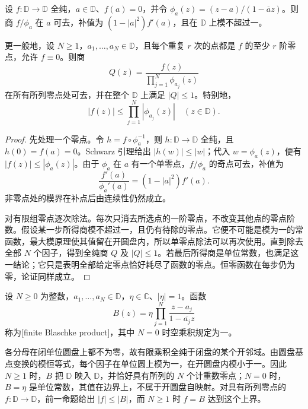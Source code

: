 \begin{proposition}\label{b3:prop:06-blaschke-division}
设 \(f:\mathbb D\rightarrow\mathbb D\) 全纯，\(a\in\mathbb D\)、\(f(a)=0\)，并令 \(\phi_a(z)=(z-a)/(1-\overline a z)\)。则商 \(f/\phi_a\) 在 \(a\) 可去，补值为 \((1-|a|^2)f'(a)\)，且在 \(\mathbb D\) 上模不超过一。

更一般地，设 \(N\ge1\)，\(a_1,\ldots,a_N\in\mathbb D\)，且每个重复 \(r\) 次的点都是 \(f\) 的至少 \(r\) 阶零点，允许 \(f\equiv0\)。则商
\[
 Q(z)=\frac{f(z)}{\prod_{j=1}^N\phi_{a_j}(z)}
\]
在所有所列零点处可去，并在整个 \(\mathbb D\) 上满足 \(|Q|\le1\)。特别地，
\[
 |f(z)|\le\prod_{j=1}^N|\phi_{a_j}(z)|\quad(z\in\mathbb D).
\]
\end{proposition}
\begin{proof}
先处理一个零点。令 \(h=f\circ\phi_a^{-1}\)，则 \(h:\mathbb D\to\mathbb D\) 全纯，且 \(h(0)=f(a)=0\)。Schwarz 引理给出 \(|h(w)|\le|w|\)；代入 \(w=\phi_a(z)\)，便有 \(|f(z)|\le|\phi_a(z)|\)。由于 \(\phi_a\) 在 \(a\) 有一个单零点，\(f/\phi_a\) 的奇点可去，补值为
\[
 \frac{f'(a)}{\phi_a'(a)}=(1-|a|^2)f'(a).
\]
非零点处的模界在补点后由连续性仍然成立。

对有限组零点逐次除法。每次只消去所选点的一阶零点，不改变其他点的零点阶数。假设某一步所得商模不超过一，且仍有待除的零点。它便不可能是模为一的常函数，最大模原理使其值留在开圆盘内，所以单零点除法可以再次使用。直到除去全部 \(N\) 个因子，得到全纯商 \(Q\) 及 \(|Q|\le1\)。若最后所得商是单位常数，也满足这一结论；它只是表明全部给定零点恰好耗尽了函数的零点。恒零函数在每步仍为零，论证同样成立。
\end{proof}

\begin{definition}\label{b3:def:06-finite-blaschke}
设 \(N\ge0\) 为整数，\(a_1,\ldots,a_N\in\mathbb D\)，\(\eta\in\mathbb C\)、\(|\eta|=1\)。函数
\[
 B(z)=\eta\prod_{j=1}^N\frac{z-a_j}{1-\overline{a_j}z}
\]
称为[finite Blaschke product]，其中 \(N=0\) 时空乘积规定为一。
\end{definition}

各分母在闭单位圆盘上都不为零，故有限乘积全纯于闭盘的某个开邻域。由圆盘基点变换的模恒等式，每个因子在单位圆上模为一，在开圆盘内模小于一。因此 \(N\ge1\) 时，\(B\) 把 \(\mathbb D\) 映入 \(\mathbb D\)，并恰好具有所列的 \(N\) 个计重数零点；\(N=0\) 时，\(B=\eta\) 是单位常数，其值在边界上，不属于开圆盘自映射。对具有所列零点的 \(f:\mathbb D\to\mathbb D\)，前一命题给出 \(|f|\le|B|\)，而 \(N\ge1\) 时 \(f=B\) 达到这个上界。

